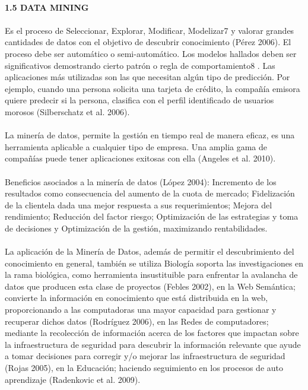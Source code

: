 \begin{flushleft}
\textbf{}\\
\textbf{1.5 DATA MINING }\\
\textbf{}\\
Es el proceso de Seleccionar, Explorar, Modificar, Modelizar7 y valorar grandes cantidades de datos con el objetivo de descubrir conocimiento (Pérez 2006). El proceso debe ser automático o semi-automático. Los modelos hallados deben ser significativos demostrando cierto patrón o regla de comportamiento8 . Las aplicaciones más utilizadas son las que necesitan algún tipo de predicción. Por ejemplo, cuando una persona solicita una tarjeta de crédito, la compañía emisora quiere predecir si la persona, clasifica con el perfil identificado de usuarios morosos (Silberschatz et al. 2006). \textbf{}\\
\textbf{}\\
La minería de datos, permite la gestión en tiempo real de manera eficaz, es una herramienta aplicable a cualquier tipo de empresa. Una amplia gama de compañías puede tener aplicaciones exitosas con ella (Angeles et al. 2010). \textbf{}\\
\textbf{}\\
Beneficios asociados a la minería de datos (López 2004): Incremento de los resultados como consecuencia del aumento de la cuota de mercado; Fidelización de la clientela dada una mejor respuesta a sus requerimientos; Mejora del rendimiento; Reducción del factor riesgo; Optimización de las estrategias y toma de decisiones y Optimización de la gestión, maximizando rentabilidades. \textbf{}\\
\textbf{}\\
La aplicación de la Minería de Datos, además de permitir el descubrimiento del conocimiento en general, también se utiliza Biología soporta las investigaciones en la rama biológica, como herramienta insustituible para enfrentar la avalancha de datos que producen esta clase de proyectos (Febles 2002), en la Web Semántica; convierte la información en conocimiento que está distribuida en la web, proporcionando a las computadoras una mayor capacidad para gestionar y recuperar dichos datos (Rodríguez 2006), en las Redes de computadores; mediante la recolección de información acerca de los factores que impactan sobre la infraestructura de seguridad para descubrir la información relevante que ayude a tomar decisiones para corregir y/o mejorar las infraestructura de seguridad (Rojas 2005), en la Educación; haciendo seguimiento en los procesos de auto aprendizaje (Radenkovic et al. 2009).










\textbf{}\\
\end{flushleft}
